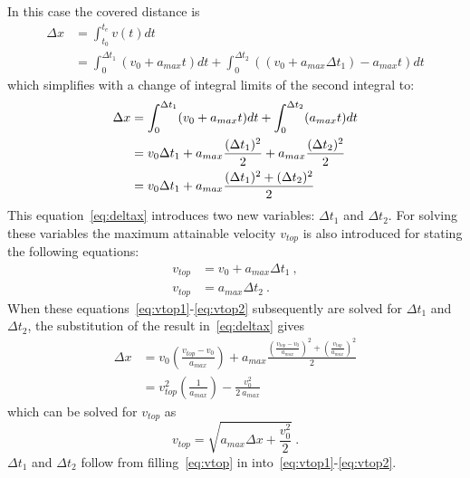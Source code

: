 \documentclass{article}
\begin{document}
	In this case the covered distance is
	\begin{align}
		\Delta x	&= \int_{t_0}^{t_e} v(t) dt\\
					&= \int_0^{\Delta t_1} (v_0+a_{max} t) dt + \int_0^{\Delta t_2} ((v_0+a_{max} \Delta t_1)-a_{max} t) dt
	\end{align}
	which simplifies with a change of integral limits of the second integral to:
	\begin{align}
		\Delta x	&= \int_0^{\Delta t_1} (v_0+a_{max} t) dt + \int_0^{\Delta t_2} (a_{max} t) dt			\notag\\
					&= v_0 \Delta t_1 + a_{max} \frac{(\Delta t_1)^2}{2} + a_{max} \frac{(\Delta t_2)^2}{2}	\notag\\
					&= v_0 \Delta t_1 + a_{max} \frac{(\Delta t_1)^2 + (\Delta t_2)^2}{2}					\label{eq:deltax}
	\end{align}
	This equation~\eqref{eq:deltax} introduces two new variables: $\Delta t_1$ and $\Delta t_2$. For solving these variables the maximum attainable velocity $v_{top}$ is also introduced for stating the following equations:
	\begin{align}
		v_{top} &= v_0+a_{max} \Delta t_1	\ ,\label{eq:vtop1}\\
		v_{top} &= a_{max} \Delta t_2 	\ .\label{eq:vtop2}
	\end{align}
	When these equations~\eqref{eq:vtop1}-\eqref{eq:vtop2} subsequently are solved for $\Delta t_1$ and $\Delta t_2$, the substitution of the result in~\eqref{eq:deltax} gives
	\begin{align}
		\Delta x 	&= v_0 \left(\frac{v_{top}-v_0}{a_{max}} \right)+ a_{max} \frac{ \left(\frac{v_{top}-v_0}{a_{max}}\right)^2 + \left(\frac{v_{top}}{a_{max}}\right)^2}{2}\\
					&= v_{top}^2 \left(\frac{1}{a_{max}} \right) - \frac{v_0^2}{2\ a_{max}}
	\end{align}
	which can be solved for $v_{top}$ as
	\begin{equation}
		v_{top} = \sqrt{a_{max}\Delta x + \frac{v_0^2}{2}} \ .\label{eq:vtop}
	\end{equation}
	$\Delta t_1$ and $\Delta t_2$ follow from filling~\eqref{eq:vtop} in into~\eqref{eq:vtop1}-\eqref{eq:vtop2}.
\end{document}
